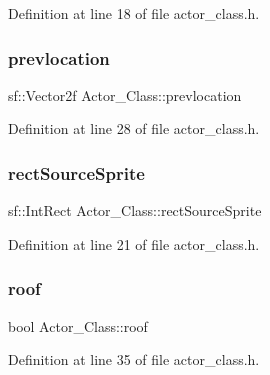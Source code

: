 Definition at line 18 of file actor\+\_\+class.\+h.

\hypertarget{class_actor___class_a9073df26beb7a0c9801fae3caa1b4743}{}\label{class_actor___class_a9073df26beb7a0c9801fae3caa1b4743} 
\subsubsection{\texorpdfstring{prevlocation}{prevlocation}}
{\footnotesize\ttfamily sf\+::\+Vector2f Actor\+\_\+\+Class\+::prevlocation}



Definition at line 28 of file actor\+\_\+class.\+h.

\hypertarget{class_actor___class_a95743733b62918f4cca704b96275d95f}{}\label{class_actor___class_a95743733b62918f4cca704b96275d95f} 
\subsubsection{\texorpdfstring{rect\+Source\+Sprite}{rectSourceSprite}}
{\footnotesize\ttfamily sf\+::\+Int\+Rect Actor\+\_\+\+Class\+::rect\+Source\+Sprite}



Definition at line 21 of file actor\+\_\+class.\+h.

\hypertarget{class_actor___class_ad4f76cc4e71f3c83b41654c538a241b3}{}\label{class_actor___class_ad4f76cc4e71f3c83b41654c538a241b3} 
\subsubsection{\texorpdfstring{roof}{roof}}
{\footnotesize\ttfamily bool Actor\+\_\+\+Class\+::roof}



Definition at line 35 of file actor\+\_\+class.\+h.

\hypertarget{class_actor___class_ae4069280f354c6ed5efd8a663c949338}{}\label{class_actor___class_ae4069280f354c6ed5efd8a663c949338} 
